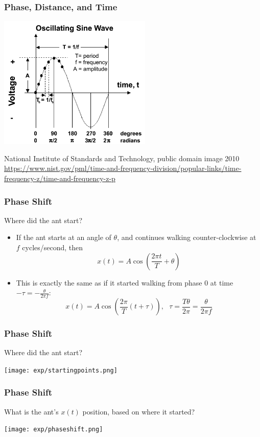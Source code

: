 \documentclass{beamer}
\begin{document}
\begin{frame}
  \frametitle{Phase, Distance, and Time}
  \centerline{\includegraphics[height=2.5in]{Oscillating_sine_wave.png}}
  \begin{tiny}
    National Institute of Standards and Technology, public domain image 2010
    \url{https://www.nist.gov/pml/time-and-frequency-division/popular-links/time-frequency-z/time-and-frequency-z-p}
  \end{tiny}
\end{frame}

\begin{frame}
  \frametitle{Phase Shift}

  Where did the ant start?
  \begin{itemize}
  \item If the ant starts at an angle of $\theta$, and continues walking counter-clockwise
    at $f$ cycles/second, then
    \[
    x(t) = A\cos\left(\frac{2\pi t}{T}+\theta\right)
    \]
  \item This is exactly the same as if it started walking from phase 0 at time
    $-\tau=-\frac{\theta}{2\pi f}$:
    \[
    x(t) = A\cos\left(\frac{2\pi}{T}\left(t+\tau\right)\right),~~~
    \tau=\frac{T\theta}{2\pi} = \frac{\theta}{2\pi f}
    \]
  \end{itemize}
\end{frame}

\begin{frame}
  \frametitle{Phase Shift}

  Where did the ant start?
  
  \centerline{\texttt{[image: exp/startingpoints.png]}}
\end{frame}

\begin{frame}
  \frametitle{Phase Shift}
  
  What is the ant's $x(t)$ position, based on where it started?
  
  \centerline{\texttt{[image: exp/phaseshift.png]}}
\end{frame}
\end{document}
